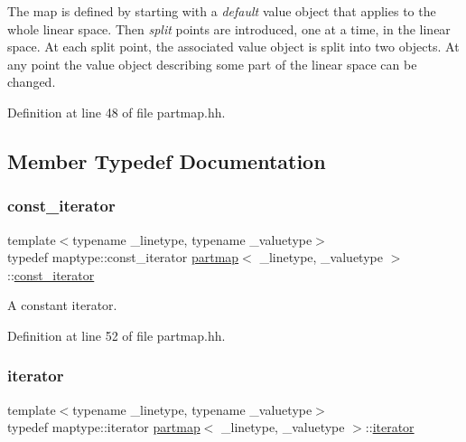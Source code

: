 The map is defined by starting with a {\itshape default} value object that applies to the whole linear space. Then {\itshape split} points are introduced, one at a time, in the linear space. At each split point, the associated value object is split into two objects. At any point the value object describing some part of the linear space can be changed. 

Definition at line 48 of file partmap.\+hh.



\subsection{Member Typedef Documentation}
\mbox{\label{classpartmap_a01c7ea382b2a493dbd4a4431a2c39520}} 
\subsubsection{\texorpdfstring{const\_iterator}{const\_iterator}}
{\footnotesize\ttfamily template$<$typename \+\_\+linetype, typename \+\_\+valuetype$>$ \\
typedef maptype\+::const\+\_\+iterator \mbox{\hyperlink{classpartmap}{partmap}}$<$ \+\_\+linetype, \+\_\+valuetype $>$\+::\mbox{\hyperlink{classpartmap_a01c7ea382b2a493dbd4a4431a2c39520}{const\+\_\+iterator}}}



A constant iterator. 



Definition at line 52 of file partmap.\+hh.

\mbox{\label{classpartmap_a795a7501233dbf866b98a51585552d06}} 
\subsubsection{\texorpdfstring{iterator}{iterator}}
{\footnotesize\ttfamily template$<$typename \+\_\+linetype, typename \+\_\+valuetype$>$ \\
typedef maptype\+::iterator \mbox{\hyperlink{classpartmap}{partmap}}$<$ \+\_\+linetype, \+\_\+valuetype $>$\+::\mbox{\hyperlink{classpartmap_a795a7501233dbf866b98a51585552d06}{iterator}}}



